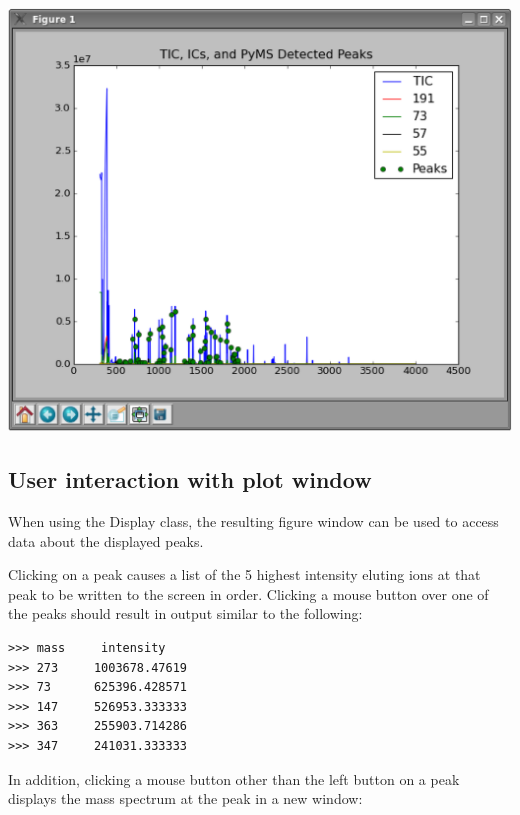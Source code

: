 \begin{center}
\includegraphics[scale=0.33]{graphics/chapter07/test-71-ICs.eps}
\end{center}

\subsection{User interaction with plot window}

When using the Display class, the resulting figure window can be used to
access data about the displayed peaks.

Clicking on a peak causes a list of the 5 highest intensity eluting ions at that
peak to be written to the screen in order.
Clicking a mouse button over one of the 
peaks should result in output similar to the following:

\begin{verbatim}
>>> mass     intensity
>>> 273     1003678.47619
>>> 73      625396.428571
>>> 147     526953.333333
>>> 363     255903.714286
>>> 347     241031.333333
\end{verbatim}

In addition, clicking a mouse button other than the left button on a peak displays the 
mass spectrum at the peak in a new window:

